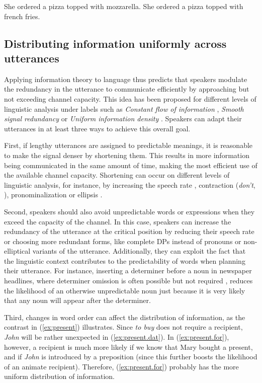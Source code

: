 \documentclass[output=paper,colorlinks,citecolor=brown]{langscibook}
\begin{document}
\ea 
    \ea She ordered a pizza topped with mozzarella.\label{ex:mozz} 
    \ex She ordered a pizza topped with french fries.\label{ex:fries}
\z
\z

\subsection{Distributing information uniformly across utterances}
Applying information theory to language thus predicts that speakers modulate the redundancy in the utterance to communicate efficiently by approaching but not exceeding channel capacity. This idea has been proposed for different levels of linguistic analysis under labels such as \textit{Constant flow of information} \citep{fenk.fenk1980}, \textit{Smooth signal redundancy} \citep{aylett.turk2004} or \textit{Uniform information density} \citep{levy.jaeger2007}.  Speakers can adapt their utterances in at least three ways to achieve this overall goal. 

First, if lengthy utterances are assigned to predictable meanings, it is reasonable to make the signal denser by shortening them. This results in more information being communicated in the same amount of time, making the most efficient use of the available channel capacity. Shortening can occur on different levels of linguistic analysis, for instance, by increasing the speech rate \citep{aylett.turk2004}, %
contraction (\textit{don't}, \cite{frank.jaeger2008}), pronominalization \citep{tily.piantadosi2009} or ellipsis \citep{levy.jaeger2007, lemke2021, schafer2021}.

Second, speakers should also avoid unpredictable words or expressions when they exceed the capacity of the channel. In this case, speakers can increase the redundancy of the utterance at the critical position by reducing their speech rate or choosing more redundant forms, like complete DPs instead of pronouns or non-elliptical variants of the utterance. Additionally, they can exploit the fact that the linguistic context contributes to the predictability of words \citep{levy2008} when planning their utterance. For instance, inserting a determiner before a noun in newspaper headlines, where determiner omission is often possible but not required \citep{stowell1991, reich2018}, reduces the likelihood of an otherwise unpredictable noun just because it is very likely that any noun will appear after the determiner. 

Third, changes in word order can affect the distribution of information, as the contrast in (\ref{ex:present}) illustrates. Since \textit{to buy} does not require a recipient, \textit{John} will be rather unexpected in (\ref{ex:present.dat}). In (\ref{ex:present.for}), however, a recipient is much more likely if we know that Mary bought a present, and if \textit{John} is introduced by a preposition (since this further boosts the likelihood of an animate recipient). Therefore, (\ref{ex:present.for}) probably has the more uniform distribution of information.
\end{document}
